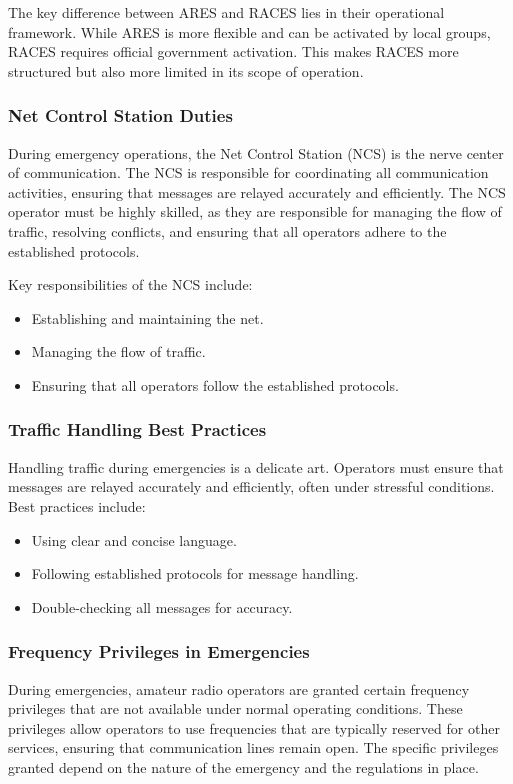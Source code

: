 The key difference between ARES and RACES lies in their operational framework. While ARES is more flexible and can be activated by local groups, RACES requires official government activation. This makes RACES more structured but also more limited in its scope of operation.

\subsubsection*{Net Control Station Duties}
During emergency operations, the Net Control Station (NCS) is the nerve center of communication. The NCS is responsible for coordinating all communication activities, ensuring that messages are relayed accurately and efficiently. The NCS operator must be highly skilled, as they are responsible for managing the flow of traffic, resolving conflicts, and ensuring that all operators adhere to the established protocols.

Key responsibilities of the NCS include:
\begin{itemize}[noitemsep]    \item Establishing and maintaining the net.
    \item Managing the flow of traffic.
    \item Ensuring that all operators follow the established protocols.
\end{itemize}

\subsubsection*{Traffic Handling Best Practices}
Handling traffic during emergencies is a delicate art. Operators must ensure that messages are relayed accurately and efficiently, often under stressful conditions. Best practices include:
\begin{itemize}[noitemsep]    \item Using clear and concise language.
    \item Following established protocols for message handling.
    \item Double-checking all messages for accuracy.
\end{itemize}

\subsubsection*{Frequency Privileges in Emergencies}
During emergencies, amateur radio operators are granted certain frequency privileges that are not available under normal operating conditions. These privileges allow operators to use frequencies that are typically reserved for other services, ensuring that communication lines remain open. The specific privileges granted depend on the nature of the emergency and the regulations in place.

